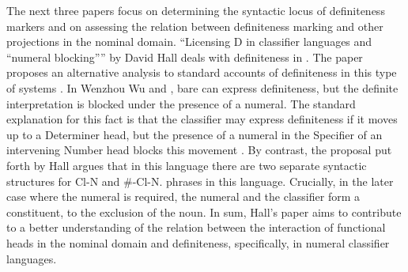 \documentclass[output=paper]{langsci/langscibook}
\begin{document}
The next three papers focus on determining the syntactic locus of definiteness markers and on assessing the relation between definiteness marking and other projections in the nominal domain. “Licensing D in classifier languages and ``numeral blocking''” by David Hall deals with definiteness in . The paper proposes an alternative analysis to standard accounts of definiteness in this type of systems \citep{ChengSybesma1999,Simpson2005}. In Wenzhou Wu and , bare  can express definiteness, but the definite interpretation is blocked under the presence of a numeral. The standard explanation for this fact is that the classifier may express definiteness if it moves up to a Determiner head, but the presence of a numeral in the Specifier of an intervening Number head blocks this movement \citep{Simpson2005}. By contrast, the proposal put forth by Hall argues that in this language there are two separate syntactic structures for Cl-N and \#-Cl-N. phrases in this language. Crucially, in the later case where the numeral is required, the numeral and the classifier form a constituent, to the exclusion of the noun. In sum, Hall’s paper aims to contribute to a better understanding of the relation between the interaction of functional heads in the nominal domain and definiteness, specifically, in numeral classifier languages. 
\end{document}
